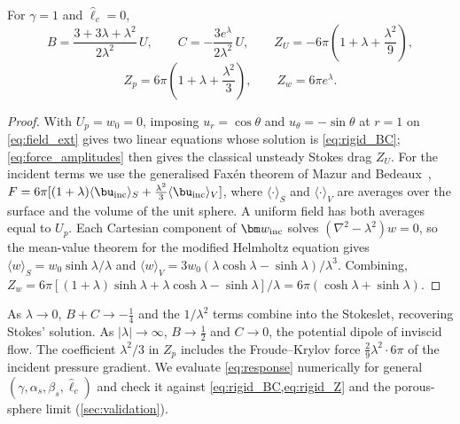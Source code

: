 \begin{proposition}\label{prop:rigid}
For $\gamma=1$ and $\hat\ell_c=0$,
\begin{equation}
  B=\frac{3+3\lambda+\lambda^2}{2\lambda^2}\,U,\qquad C=-\frac{3e^{\lambda}}{2\lambda^2}\,U,\qquad
  Z_U=-6\pi\left(1+\lambda+\frac{\lambda^2}{9}\right),
  \label{eq:rigid_BC}
\end{equation}
\begin{equation}
  Z_p=6\pi\left(1+\lambda+\frac{\lambda^2}{3}\right),\qquad Z_w=6\pi e^{\lambda}.
  \label{eq:rigid_Z}
\end{equation}
\end{proposition}
\begin{proof}
With $U_p=w_0=0$, imposing $u_r=\cos\theta$ and $u_\theta=-\sin\theta$ at $r=1$ on \cref{eq:field_ext} gives two linear
equations whose solution is \cref{eq:rigid_BC}; \cref{eq:force_amplitudes} then gives the classical unsteady Stokes
drag $Z_U$. For the incident terms we use the generalised Faxén theorem of Mazur and
Bedeaux~\cite{mazur1974generalization}, $F=6\pi[(1+\lambda)\langle\bu_{\rm inc}\rangle_S+\tfrac{\lambda^2}{3}
\langle\bu_{\rm inc}\rangle_V]$, where $\langle\cdot\rangle_S$ and $\langle\cdot\rangle_V$ are averages over the surface
and the volume of the unit sphere. A uniform field has both averages equal to $U_p$. Each Cartesian component of
$\bm w_{\rm inc}$ solves $(\nabla^2-\lambda^2)w=0$, so the mean-value theorem for the modified Helmholtz equation gives
$\langle w\rangle_S=w_0\sinh\lambda/\lambda$ and $\langle w\rangle_V=3w_0(\lambda\cosh\lambda-\sinh\lambda)/\lambda^3$.
Combining, $Z_w=6\pi[(1+\lambda)\sinh\lambda+\lambda\cosh\lambda-\sinh\lambda]/\lambda=6\pi(\cosh\lambda+\sinh\lambda)$.
\end{proof}

As $\lambda\to0$, $B+C\to-\tfrac14$ and the $1/\lambda^2$ terms combine into the Stokeslet, recovering Stokes' solution.
As $|\lambda|\to\infty$, $B\to\tfrac12$ and $C\to0$, the potential dipole of inviscid flow. The coefficient
$\lambda^2/3$ in $Z_p$ includes the Froude--Krylov force $\tfrac{2}{9}\lambda^2\cdot6\pi$ of the incident pressure
gradient. We evaluate \cref{eq:response} numerically for general $(\gamma,\alpha_s,\beta_s,\hat\ell_c)$ and check it
against \cref{eq:rigid_BC,eq:rigid_Z} and the porous-sphere limit (\cref{sec:validation}).

